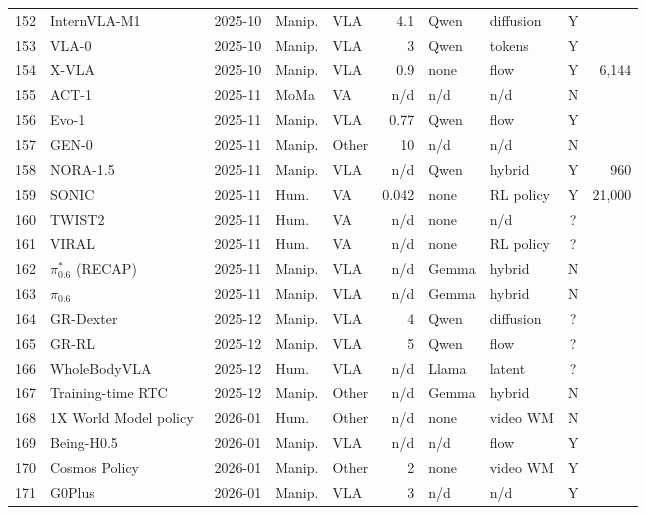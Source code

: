 \begin{longtable}{@{}r p{3.55cm} l l l r l l c r@{}}
152 & InternVLA-M1~\cite{ax251013778} & 2025-10 & Manip. & VLA & 4.1 & Qwen & diffusion & Y & \\
153 & VLA-0~\cite{ax251013054} & 2025-10 & Manip. & VLA & 3 & Qwen & tokens & Y & \\
154 & X-VLA~\cite{ax251010274} & 2025-10 & Manip. & VLA & 0.9 & none & flow & Y & 6,144\\
155 & ACT-1~\cite{web-act-1} & 2025-11 & MoMa & VA & n/d & n/d & n/d & N & \\
156 & Evo-1~\cite{ax251104555} & 2025-11 & Manip. & VLA & 0.77 & Qwen & flow & Y & \\
157 & GEN-0~\cite{web-gen-0} & 2025-11 & Manip. & Other & 10 & n/d & n/d & N & \\
158 & NORA-1.5~\cite{ax251114659} & 2025-11 & Manip. & VLA & n/d & Qwen & hybrid & Y & 960\\
159 & SONIC~\cite{ax251107820} & 2025-11 & Hum. & VA & 0.042 & none & RL policy & Y & 21,000\\
160 & TWIST2~\cite{ax251102832} & 2025-11 & Hum. & VA & n/d & none & n/d & ? & \\
161 & VIRAL~\cite{ax251115200} & 2025-11 & Hum. & VA & n/d & none & RL policy & ? & \\
162 & $\pi^*_{0.6}$ (RECAP)~\cite{ax251114759} & 2025-11 & Manip. & VLA & n/d & Gemma & hybrid & N & \\
163 & $\pi_{0.6}$~\cite{web-pi0-6} & 2025-11 & Manip. & VLA & n/d & Gemma & hybrid & N & \\
164 & GR-Dexter~\cite{ax251224210} & 2025-12 & Manip. & VLA & 4 & Qwen & diffusion & ? & \\
165 & GR-RL~\cite{ax251201801} & 2025-12 & Manip. & VLA & 5 & Qwen & flow & ? & \\
166 & WholeBodyVLA~\cite{ax251211047} & 2025-12 & Hum. & VLA & n/d & Llama & latent & ? & \\
167 & Training-time RTC~\cite{ax251205964} & 2025-12 & Manip. & Other & n/d & Gemma & hybrid & N & \\
168 & 1X World Model policy~\cite{web-1x-world-model} & 2026-01 & Hum. & Other & n/d & none & video WM & N & \\
169 & Being-H0.5~\cite{ax260112993} & 2026-01 & Manip. & VLA & n/d & n/d & flow & Y & \\
170 & Cosmos Policy~\cite{ax260116163} & 2026-01 & Manip. & Other & 2 & none & video WM & Y & \\
171 & G0Plus~\cite{web-g0plus} & 2026-01 & Manip. & VLA & 3 & n/d & n/d & Y & \\

\end{longtable}
